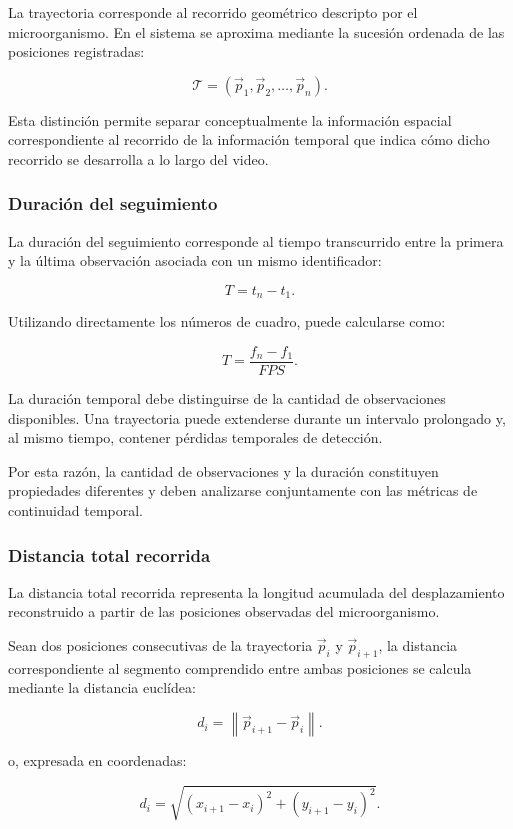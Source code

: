 La trayectoria corresponde al recorrido geométrico descripto por el microorganismo. En el sistema se aproxima mediante la sucesión ordenada de las posiciones registradas:

\[
\mathcal{T}=(\vec{p}_1,\vec{p}_2,\ldots,\vec{p}_n).
\]

Esta distinción permite separar conceptualmente la información espacial correspondiente al recorrido de la información temporal que indica cómo dicho recorrido se desarrolla a lo largo del video.

\subsubsection{Duración del seguimiento}

La duración del seguimiento corresponde al tiempo transcurrido entre la primera y la última observación asociada con un mismo identificador:

\[
T=t_n-t_1.
\]

Utilizando directamente los números de cuadro, puede calcularse como:

\[
T=\frac{f_n-f_1}{FPS}.
\]

La duración temporal debe distinguirse de la cantidad de observaciones disponibles. Una trayectoria puede extenderse durante un intervalo prolongado y, al mismo tiempo, contener pérdidas temporales de detección.

Por esta razón, la cantidad de observaciones y la duración constituyen propiedades diferentes y deben analizarse conjuntamente con las métricas de continuidad temporal.

\subsubsection{Distancia total recorrida}

La distancia total recorrida representa la longitud acumulada del desplazamiento reconstruido a partir de las posiciones observadas del microorganismo.

Sean dos posiciones consecutivas de la trayectoria $\vec{p}_i$ y $\vec{p}_{i+1}$, la distancia correspondiente al segmento comprendido entre ambas posiciones se calcula mediante la distancia euclídea:

\[
d_i=\left\|\vec{p}_{i+1}-\vec{p}_i\right\|.
\]

o, expresada en coordenadas:

\[
d_i=\sqrt{(x_{i+1}-x_i)^2+(y_{i+1}-y_i)^2}.
\]

